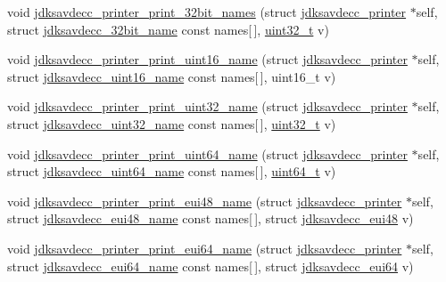 \begin{DoxyCompactItemize}
\item 
void \hyperlink{group__util_ga12c5206fd238e3e8188693746f0d8ce7}{jdksavdecc\+\_\+printer\+\_\+print\+\_\+32bit\+\_\+names} (struct \hyperlink{structjdksavdecc__printer}{jdksavdecc\+\_\+printer} $\ast$self, struct \hyperlink{structjdksavdecc__32bit__name}{jdksavdecc\+\_\+32bit\+\_\+name} const names\mbox{[}$\,$\mbox{]}, \hyperlink{parse_8c_a6eb1e68cc391dd753bc8ce896dbb8315}{uint32\+\_\+t} v)
\item 
void \hyperlink{group__util_ga62486d864a66773d19bbbe23cebf346a}{jdksavdecc\+\_\+printer\+\_\+print\+\_\+uint16\+\_\+name} (struct \hyperlink{structjdksavdecc__printer}{jdksavdecc\+\_\+printer} $\ast$self, struct \hyperlink{structjdksavdecc__uint16__name}{jdksavdecc\+\_\+uint16\+\_\+name} const names\mbox{[}$\,$\mbox{]}, uint16\+\_\+t v)
\item 
void \hyperlink{group__util_ga730a13ae4ddf17ddcd5f8ca399bd41ad}{jdksavdecc\+\_\+printer\+\_\+print\+\_\+uint32\+\_\+name} (struct \hyperlink{structjdksavdecc__printer}{jdksavdecc\+\_\+printer} $\ast$self, struct \hyperlink{structjdksavdecc__uint32__name}{jdksavdecc\+\_\+uint32\+\_\+name} const names\mbox{[}$\,$\mbox{]}, \hyperlink{parse_8c_a6eb1e68cc391dd753bc8ce896dbb8315}{uint32\+\_\+t} v)
\item 
void \hyperlink{group__util_ga5d6cd39d626f480056280af97205edef}{jdksavdecc\+\_\+printer\+\_\+print\+\_\+uint64\+\_\+name} (struct \hyperlink{structjdksavdecc__printer}{jdksavdecc\+\_\+printer} $\ast$self, struct \hyperlink{structjdksavdecc__uint64__name}{jdksavdecc\+\_\+uint64\+\_\+name} const names\mbox{[}$\,$\mbox{]}, \hyperlink{parse_8c_aec6fcb673ff035718c238c8c9d544c47}{uint64\+\_\+t} v)
\item 
void \hyperlink{group__util_ga3bed38ef44cf3b94cc27d97a4f9b7242}{jdksavdecc\+\_\+printer\+\_\+print\+\_\+eui48\+\_\+name} (struct \hyperlink{structjdksavdecc__printer}{jdksavdecc\+\_\+printer} $\ast$self, struct \hyperlink{structjdksavdecc__eui48__name}{jdksavdecc\+\_\+eui48\+\_\+name} const names\mbox{[}$\,$\mbox{]}, struct \hyperlink{structjdksavdecc__eui48}{jdksavdecc\+\_\+eui48} v)
\item 
void \hyperlink{group__util_gaeac8b09f9879e663bf3bc59c8d98d451}{jdksavdecc\+\_\+printer\+\_\+print\+\_\+eui64\+\_\+name} (struct \hyperlink{structjdksavdecc__printer}{jdksavdecc\+\_\+printer} $\ast$self, struct \hyperlink{structjdksavdecc__eui64__name}{jdksavdecc\+\_\+eui64\+\_\+name} const names\mbox{[}$\,$\mbox{]}, struct \hyperlink{structjdksavdecc__eui64}{jdksavdecc\+\_\+eui64} v)
\item 

\end{DoxyCompactItemize}
